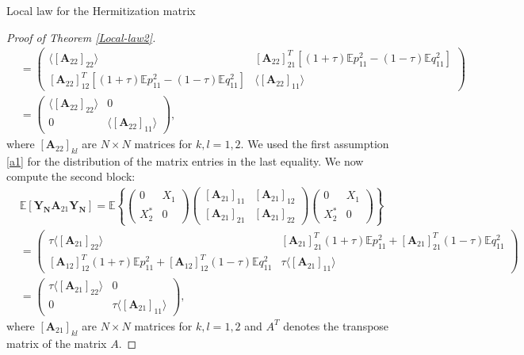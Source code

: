 \documentclass[11pt, a4paper, oneside]{book}
\numberwithin{equation}{chapter}
\newcommand{\E}{\mathbb E}
\begin{document}
\begin{section}{Local law for the Hermitization matrix}
\begin{proof}[Proof of Theorem \ref{Local-law2}]
\begin{align*}
&=
 \begin{pmatrix} \langle[\mathbf{A}_{22}]_{22} \rangle & [\mathbf{A}_{22}]_{21}^T \left [ (1+\tau)\E p_{11}^2 - (1-\tau) \E q_{11}^2 \right ]  \\ [\mathbf{A}_{22}]_{12}^T \left [ (1+\tau)\E p_{11}^2 - (1-\tau) \E q_{11}^2 \right ] & \langle [\mathbf{A}_{22}]_{11} \rangle \end{pmatrix}\\
&=
 \begin{pmatrix} \langle[ \mathbf{A}_{22}]_{22} \rangle  & 0 \\ 0 & \langle [\mathbf{A}_{22}]_{11} \rangle \end{pmatrix},
\end{align*}
where $[\mathbf{A}_{22}]_{kl}$ are $N \times N$ matrices for $k,l=1,2$. We used the first assumption \ref{a1} for the distribution of the matrix entries in the last equality. We now compute the second block:
%
\begin{align*}
&\E [\mathbf{Y_N} \mathbf{A}_{21} \mathbf{Y_N}] = \E \left \{ \begin{pmatrix} 0 & X_1 \\ X_2^* & 0 \end{pmatrix} \begin{pmatrix} [\mathbf{A}_{21}]_{11} & [\mathbf{A}_{21}]_{12} \\ [\mathbf{A}_{21}]_{21} & [\mathbf{A}_{21}]_{22} \end{pmatrix} \begin{pmatrix} 0 & X_1 \\ X_2^* & 0 \end{pmatrix}\right \}
\\
&= \begin{pmatrix} \tau \langle  [\mathbf{A}_{21}]_{22} \rangle & [\mathbf{A}_{21}]_{21}^T (1+\tau)\E p_{11}^2 + [\mathbf{A}_{21}]_{21}^T (1-\tau) \E q_{11}^2 \\  [\mathbf{A}_{12}]_{12}^T (1+\tau)\E p_{11}^2 + [\mathbf{A}_{12}]_{12}^T (1-\tau) \E q_{11}^2 & \tau \langle [\mathbf{A}_{21}]_{11} \rangle \end{pmatrix} \\
&=
 \begin{pmatrix} \tau \langle  [\mathbf{A}_{21}]_{22} \rangle & 0\\ 0 & \tau \langle [\mathbf{A}_{21}]_{11} \rangle \end{pmatrix},
\end{align*}
%
where $[\mathbf{A}_{21}]_{kl}$ are $N \times N$ matrices for $k,l=1,2$ and $A^T$ denotes the transpose matrix of the matrix $A$.


\end{proof}
\end{section}
\end{document}
